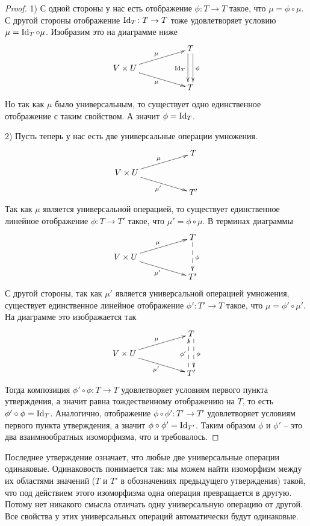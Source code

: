 \begin{proof}
1) С одной стороны у нас есть отображение $\phi\colon T\to T$ такое, что $\mu = \phi \circ \mu$. С другой стороны отображение $\operatorname{Id}_T\colon T\to T$ тоже удовлетворяет условию $\mu = \operatorname{Id}_T \circ \mu$. Изобразим это на диаграмме ниже
\[
\xymatrix@R=10pt{
	{}&{}&{T}\ar@<3pt>[dd]^{\phi}\ar@<-3pt>[dd]_{\Identity_T}\\
	{V\times U}\ar[urr]^{\mu}\ar[drr]_{\mu}&{}&{}\\
	{}&{}&{T}\\
}
\]
Но так как $\mu$ было универсальным, то существует одно единственное отображение с таким свойством. А значит $\phi = \operatorname{Id}_T$.

2) Пусть теперь у нас есть две универсальные операции умножения.
\[
\xymatrix@R=10pt{
	{}&{}&{T}\\
	{V\times U}\ar[urr]^{\mu}\ar[drr]_{\mu'}&{}&{}\\
	{}&{}&{T'}\\
}
\]
Так как $\mu$ является универсальной операцией, то существует единственное линейное отображение $\phi\colon T\to T'$ такое, что $\mu' = \phi \circ \mu$. В терминах диаграммы
\[
\xymatrix@R=10pt{
	{}&{}&{T}\ar@{-->}[dd]^{\phi}\\
	{V\times U}\ar[urr]^{\mu}\ar[drr]_{\mu'}&{}&{}\\
	{}&{}&{T'}\\
}
\]
С другой стороны, так как $\mu'$ является универсальной операцией умножения, существует единственное линейное отображение $\phi'\colon T'\to T$ такое, что $\mu = \phi' \circ \mu'$. На диаграмме это изображается так
\[
\xymatrix@R=10pt{
	{}&{}&{T}\ar@{-->}@<3pt>[dd]^{\phi}\\
	{V\times U}\ar[urr]^{\mu}\ar[drr]_{\mu'}&{}&{}\\
	{}&{}&{T'}\ar@{-->}@<3pt>[uu]^{\phi'}\\
}
\]
Тогда композиция $\phi'\circ \phi \colon T\to T$ удовлетворяет условиям первого пункта утверждения, а значит равна тождественному отображению на $T$, то есть $\phi'\circ \phi = \operatorname{Id}_T$. Аналогично, отображение $\phi\circ \phi'\colon T'\to T'$ удовлетворяет условиям первого пункта утверждения, а значит $\phi\circ \phi' = \operatorname{Id}_{T'}$. Таким образом $\phi$ и $\phi'$ -- это два взаимнообратных изоморфизма, что и требовалось.
\end{proof}

Последнее утверждение означает, что любые две универсальные операции одинаковые. Одинаковость понимается так: мы можем найти изоморфизм между их областями значений ($T$ и $T'$ в обозначениях предыдущего утверждения) такой, что под действием этого изоморфизма одна операция превращается в другую. Потому нет никакого смысла отличать одну универсальную операцию от другой. Все свойства у этих универсальных операций автоматически будут одинаковые.
